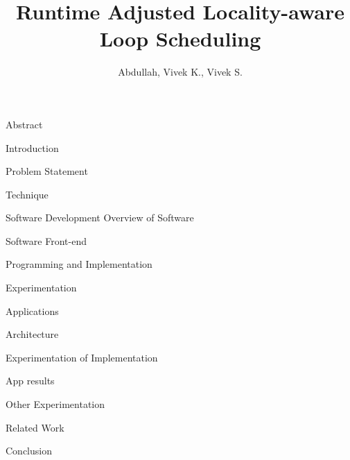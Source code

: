 \documentclass[12pt]{article}
\title{Runtime Adjusted Locality-aware Loop Scheduling}
\author{Abdullah, Vivek K., Vivek S.}
\begin{document}
 

\begin{outline}[enumerate] 

\1 Abstract 
 
    
\1 Introduction 

\1 Problem Statement 

\1 Technique 

\1 Software Development 
  \2 Overview of Software 
   
  \2 Software Front-end 
  
  \2 Programming and Implementation 


\1 Experimentation 

    \2 Applications 
       \3 
       \3 
       \3
       
    \2 Architecture 
     
    \2 Experimentation of Implementation 
       
    \2 App results 
    
    \2 Other Experimentation 
       
\1 Related Work

    \2 
    \2
    \2 

\1 Conclusion 

    \2 
    \2
    \2 

\end{outline}
\end{document}
